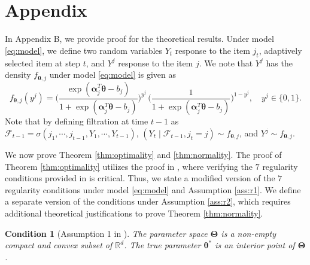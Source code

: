 \documentclass[12pt]{article}
\newcommand{\bfTheta}{\boldsymbol{\Theta}}
\newcommand{\bfalpha}{\boldsymbol{\alpha}}
\newcommand{\bftheta}{\boldsymbol{\theta}}
\newtheorem{condition}{Condition}[section]
\begin{document}
\section*{Appendix \thesection} \label{appendix:proof}
In Appendix B, we provide proof for the theoretical results.
Under model \eqref{eq:model}, we define two random variables $Y_t$ response to the item $j_t$, adaptively selected item at step $t$, and $Y^j$ response to the item $j$. We note that $Y^j$ has the density $f_{\bftheta, j}$ under model \eqref{eq:model} is given as
\begin{equation} \label{e:density}
f_{\bftheta, j}(y^j) = \Big( \frac{\exp( \bfalpha_j^T \bftheta - b_j)}{1 + \exp( \bfalpha_j^T \bftheta - b_j)} \Big)^{y^j} \, \Big( \frac{1}{1 + \exp( \bfalpha_j^T \bftheta - b_j)} \Big)^{1 - y^j}, \quad y^j \in \{0,1\}.
\end{equation} 
Note that by defining filtration at time $t-1$ as $\mathcal{F}_{t-1} = \sigma( j_1, \cdots, j_{t-1}, Y_1, \cdots, Y_{t-1})$, $(Y_t \mid \mathcal{F}_{t-1}, j_t = j) \sim f_{\bftheta, j}$, and $Y^j \sim f_{\bftheta, j}$.

We now prove Theorem \ref{thm:optimality} and \ref{thm:normality}. The proof of Theorem \ref{thm:optimality} utilizes the proof in , where verifying the $7$ regularity conditions provided in  is critical. Thus, we state a modified version of the $7$ regularity conditions under model \eqref{eq:model} and Assumption \ref{ass:r1}. We define a separate version of the conditions under Assumption \ref{ass:r2}, which requires additional theoretical justifications to prove Theorem \ref{thm:normality}.
 
\begin{condition}[Assumption 1 in ] \label{c:c1}
The parameter space $\bfTheta$ is a non-empty compact and convex subset of $\mathbb{R}^d$. The true parameter $\bftheta^{\ast}$ is an interior point of $\bfTheta$.
\end{condition}
\end{document}
